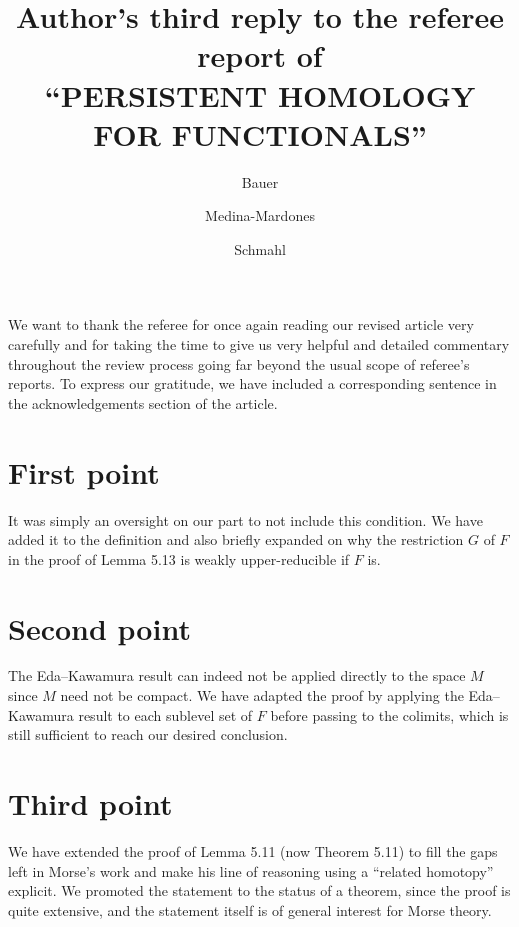 \documentclass{article}
\title{Author's third reply to the referee report of \\ \textsc{
		``PERSISTENT HOMOLOGY FOR FUNCTIONALS''
	}
}
\author{Bauer \and Medina-Mardones \and Schmahl}
\begin{document}
	\maketitle
	We want to thank the referee for once again reading our revised article very carefully and for taking the time to give us very helpful and detailed commentary throughout the review process going far beyond the usual scope of referee's reports. To express our gratitude, we have included a corresponding sentence in the acknowledgements section of the article.

	\section{First point}
	It was simply an oversight on our part to not include this condition. We have added it to the definition and also briefly expanded on why the restriction $G$ of $F$ in the proof of Lemma 5.13 is weakly upper-reducible if $F$ is.
	\section{Second point}
	The Eda--Kawamura result can indeed not be applied directly to the space $M$ since $M$ need not be compact. We have adapted the proof by applying the Eda--Kawamura result to each sublevel set of $F$ before passing to the colimits, which is still sufficient to reach our desired conclusion.
	\section{Third point}
	We have extended the proof of Lemma 5.11 (now Theorem 5.11) to fill the gaps left in Morse's work and make his line of reasoning using a ``related homotopy'' explicit. We promoted the statement to the status of a theorem, since the proof is quite extensive, and the statement itself is of general interest for Morse theory. 
\end{document}
